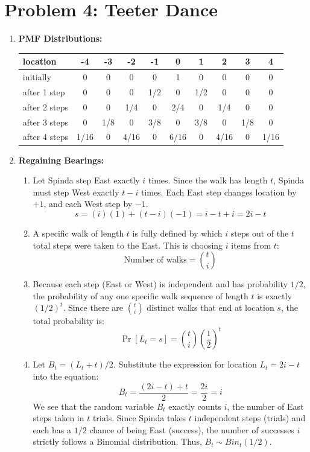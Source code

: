 \documentclass[11pt]{article}
\begin{document}
\vspace{0.5cm}

\section*{Problem 4: Teeter Dance}
\begin{enumerate}[label=\textbf{(\alph*)}]
    \item \textbf{PMF Distributions:}
    
    \begin{tabular}{|l|c|c|c|c|c|c|c|c|c|}
    \hline
    \textbf{location} & \textbf{-4} & \textbf{-3} & \textbf{-2} & \textbf{-1} & \textbf{0} & \textbf{1} & \textbf{2} & \textbf{3} & \textbf{4} \\
    \hline
    initially & 0 & 0 & 0 & 0 & 1 & 0 & 0 & 0 & 0 \\
    after 1 step & 0 & 0 & 0 & 1/2 & 0 & 1/2 & 0 & 0 & 0 \\
    after 2 steps & 0 & 0 & 1/4 & 0 & 2/4 & 0 & 1/4 & 0 & 0 \\
    after 3 steps & 0 & 1/8 & 0 & 3/8 & 0 & 3/8 & 0 & 1/8 & 0 \\
    after 4 steps & 1/16 & 0 & 4/16 & 0 & 6/16 & 0 & 4/16 & 0 & 1/16 \\
    \hline
    \end{tabular}

    \item \textbf{Regaining Bearings:}
    \begin{enumerate}[label=(\roman*)]
        \item Let Spinda step East exactly $i$ times. Since the walk has length $t$, Spinda must step West exactly $t-i$ times. 
        Each East step changes location by $+1$, and each West step by $-1$.
        $$ s = (i)(1) + (t-i)(-1) = i - t + i = 2i - t $$
        
        \item A specific walk of length $t$ is fully defined by which $i$ steps out of the $t$ total steps were taken to the East. This is choosing $i$ items from $t$:
        $$ \text{Number of walks} = \binom{t}{i} $$
        
        \item Because each step (East or West) is independent and has probability $1/2$, the probability of any one specific walk sequence of length $t$ is exactly $(1/2)^t$. 
        Since there are $\binom{t}{i}$ distinct walks that end at location $s$, the total probability is:
        $$ \Pr[L_t = s] = \binom{t}{i} \left(\frac{1}{2}\right)^t $$
        
        \item Let $B_t = (L_t + t)/2$. 
        Substitute the expression for location $L_t = 2i - t$ into the equation:
        $$ B_t = \frac{(2i - t) + t}{2} = \frac{2i}{2} = i $$
        We see that the random variable $B_t$ exactly counts $i$, the number of East steps taken in $t$ trials. 
        Since Spinda takes $t$ independent steps (trials) and each has a $1/2$ chance of being East (success), the number of successes $i$ strictly follows a Binomial distribution.
        Thus, $B_t \sim Bin_t(1/2)$.
    \end{enumerate}
\end{enumerate}
\end{document}
